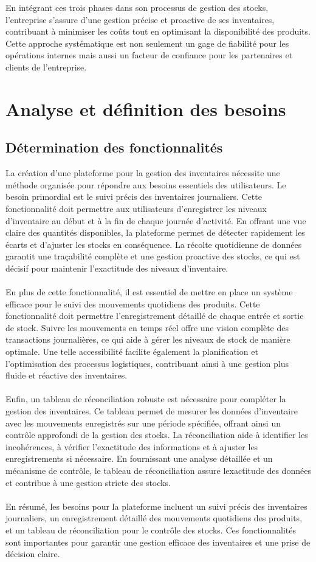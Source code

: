 \documentclass[a4paper, oneside, 12pt, final]{extreport}
\begin{document}
En intégrant ces trois phases dans son processus de gestion des stocks, l'entreprise s'assure d'une gestion précise et proactive de ses inventaires, contribuant à minimiser les coûts tout en optimisant la disponibilité des produits. Cette approche systématique est non seulement un gage de fiabilité pour les opérations internes mais aussi un facteur de confiance pour les partenaires et clients de l'entreprise.

\chapter{Analyse et définition des besoins}
\section{Détermination des fonctionnalités}
La création d'une plateforme pour la gestion des inventaires nécessite une méthode organisée pour répondre aux besoins essentiels des utilisateurs. Le besoin primordial est le suivi précis des inventaires journaliers. Cette fonctionnalité doit permettre aux utilisateurs d'enregistrer les niveaux d'inventaire au début et à la fin de chaque journée d'activité. En offrant une vue claire des quantités disponibles, la plateforme permet de détecter rapidement les écarts et d'ajuster les stocks en conséquence. La récolte quotidienne de données garantit une traçabilité complète et une gestion proactive des stocks, ce qui est décisif pour maintenir l'exactitude des niveaux d'inventaire.
\\
\\
En plus de cette fonctionnalité, il est essentiel de mettre en place un système efficace pour le suivi des mouvements quotidiens des produits. Cette fonctionnalité doit permettre l'enregistrement détaillé de chaque entrée et sortie de stock. Suivre les mouvements en temps réel offre une vision complète des transactions journalières, ce qui aide à gérer les niveaux de stock de manière optimale. Une telle accessibilité facilite également la planification et l'optimisation des processus logistiques, contribuant ainsi à une gestion plus fluide et réactive des inventaires.
\\
\\
Enfin, un tableau de réconciliation robuste est nécessaire pour compléter la gestion des inventaires. Ce tableau permet de mesurer les données d'inventaire avec les mouvements enregistrés sur une période spécifiée, offrant ainsi un contrôle approfondi de la gestion des stocks. La réconciliation aide à identifier les incohérences, à vérifier l'exactitude des informations et à ajuster les enregistrements si nécessaire. En fournissant une analyse détaillée et un mécanisme de contrôle, le tableau de réconciliation assure lexactitude des données et contribue à une gestion stricte des stocks.
\\
\\
En résumé, les besoins pour la plateforme incluent un suivi précis des inventaires journaliers, un enregistrement détaillé des mouvements quotidiens des produits, et un tableau de réconciliation pour le contrôle des stocks. Ces fonctionnalités sont importantes pour garantir une gestion efficace des inventaires et une prise de décision claire.
\end{document}
